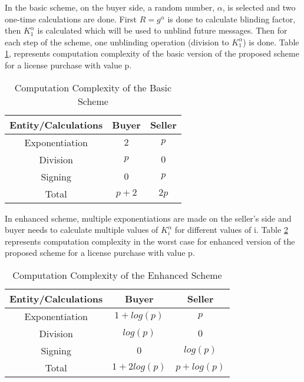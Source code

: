 \documentclass[times]{secauth}
\begin{document}
In the basic scheme, on the buyer side, a random number, $\alpha$, is selected and two one-time calculations are done. First $R=g^\alpha$ is done to calculate blinding factor, then $K_1^\alpha$ is calculated which will be used to unblind future messages. Then for each step of the scheme, one unblinding operation (division to $K_1^\alpha$) is done.
Table \ref{table:basic_communication}, represents computation complexity of the basic version of the proposed scheme for a license purchase with value p.

\begin{table}
\caption{Computation Complexity of the Basic Scheme}
\begin{tabular}{|c|c|c|}
\hline \textbf{Entity/Calculations} & \textbf{Buyer} & \textbf{Seller} \\ 
\hline Exponentiation & $2$ & $p$ \\ 
\hline Division & $p$ & $0$ \\ 
\hline Signing & $0$ & $p$ \\ 
\hline Total & $p+2$ & $2p$ \\ 
\hline 
\end{tabular} 
\label{table:basic_communication}
\end{table}

In enhanced scheme, multiple exponentiations are made on the seller's side and buyer needs to calculate multiple values of $K_i^\alpha$ for different values of i. Table \ref{table:enhanced_communication} represents computation complexity in the worst case for enhanced version of the proposed scheme for a license purchase with value p. 

\begin{table}
\caption{Computation Complexity of the Enhanced Scheme}
\begin{tabular}{|c|c|c|}
\hline \textbf{Entity/Calculations} & \textbf{Buyer} & \textbf{Seller} \\ 
\hline Exponentiation & $1+log(p)$ & $p$ \\ 
\hline Division & $log(p)$ & $0$ \\ 
\hline Signing & $0$ & $log(p)$ \\ 
\hline Total & $1+2log(p)$ & $p+log(p)$ \\ 
\hline 
\end{tabular} 
\label{table:enhanced_communication}
\end{table}
\end{document}
